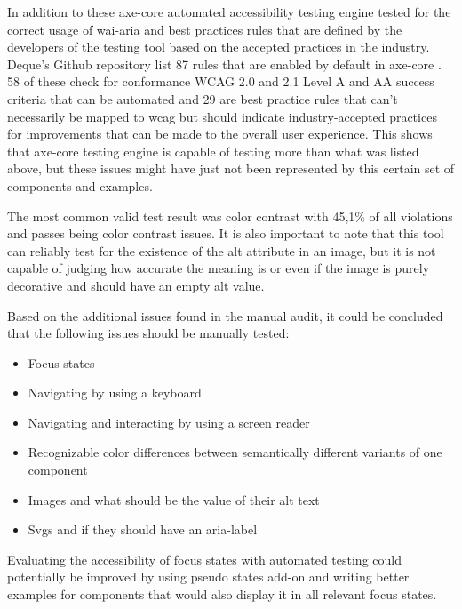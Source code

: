 \documentclass{master_thesis}
\begin{document}
In addition to these axe-core automated accessibility testing engine tested for the correct usage of \ac{wai-aria} and best practices rules that are defined by the developers of the testing tool based on the accepted practices in the industry. Deque's Github repository list 87 rules that are enabled by default in axe-core \citep{Fiers2023}. 58 of these check for conformance WCAG 2.0 and 2.1 Level A and AA success criteria that can be automated and 29 are best practice rules that can't necessarily be mapped to \ac{wcag} but should indicate industry-accepted practices for improvements that can be made to the overall user experience. This shows that axe-core testing engine is capable of testing more than what was listed above, but these issues might have just not been represented by this certain set of components and examples.

The most common valid test result was color contrast with 45,1\% of all violations and passes being color contrast issues. It is also important to note that this tool can reliably test for the existence of the alt attribute in an image, but it is not capable of judging how accurate the meaning is or even if the image is purely decorative and should have an empty alt value.

Based on the additional issues found in the manual audit, it could be concluded that the following issues should be manually tested:
\begin{itemize}
	\item Focus states
	\item Navigating by using a keyboard
	\item Navigating and interacting by using a screen reader
	\item Recognizable color differences between semantically different variants of one component
	\item Images and what should be the value of their alt text
	\item Svgs and if they should have an aria-label
\end{itemize}

Evaluating the accessibility of focus states with automated testing could potentially be improved by using pseudo states add-on and writing better examples for components that would also display it in all relevant focus states.
\end{document}
